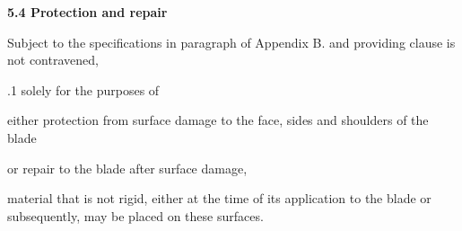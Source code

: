\documentclass[12pt]{article}
\begin{document}
\vspace{\baselineskip}
{\fontsize{11pt}{13.2pt}\selectfont \textbf{5.4 \tabto{0.47in} Protection and repair}\par}\par


\vspace{\baselineskip}
{\fontsize{9pt}{10.8pt}\selectfont Subject to the specifications in paragraph of Appendix B. and providing clause is not contravened,\par}\par


\vspace{\baselineskip}

\vspace{\baselineskip}

\vspace{\baselineskip}
\begin{adjustwidth}{0.0in}{-0.01in}
\begin{Center}
{\fontsize{8pt}{9.6pt}\par}
\end{Center}\par

\end{adjustwidth}


\vspace{\baselineskip}
{\fontsize{9pt}{10.8pt}.1 \tabto{0.49in} solely for the purposes of\par}\par


\vspace{\baselineskip}
\begin{adjustwidth}{1.0in}{0.0in}
{\fontsize{9pt}{10.8pt}\selectfont either \tabto{1.49in} protection from surface damage to the face, sides and shoulders of the blade\par}\par

\end{adjustwidth}


\vspace{\baselineskip}
\begin{adjustwidth}{1.0in}{0.0in}
{\fontsize{9pt}{10.8pt}\selectfont or \tabto{1.49in} repair to the blade after surface damage,\par}\par

\end{adjustwidth}


\vspace{\baselineskip}
\begin{adjustwidth}{0.5in}{0.11in}
{\fontsize{9pt}{10.8pt}\selectfont material that is not rigid, either at the time of its application to the blade or subsequently, may be placed on these surfaces.\par}\par

\end{adjustwidth}
\end{document}
